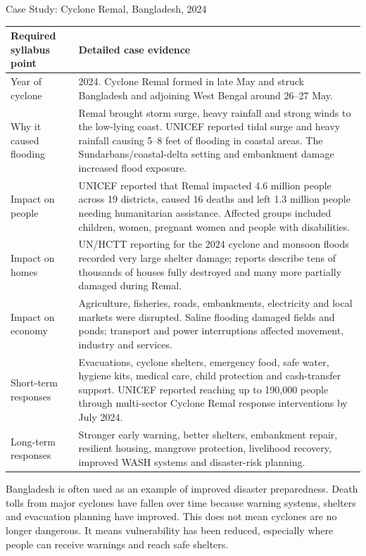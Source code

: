 \documentclass[11pt,a4paper]{article}
\begin{document}
\begin{casebox}{Case Study: Cyclone Remal, Bangladesh, 2024}
\begin{longtable}{p{3.35cm}p{11.2cm}}
\toprule
\textbf{Required syllabus point} & \textbf{Detailed case evidence}\\
\midrule
Year of cyclone & 2024. Cyclone Remal formed in late May and struck Bangladesh and adjoining West Bengal around 26--27 May.\\
Why it caused flooding & Remal brought storm surge, heavy rainfall and strong winds to the low-lying coast. UNICEF reported tidal surge and heavy rainfall causing 5--8 feet of flooding in coastal areas. The Sundarbans/coastal-delta setting and embankment damage increased flood exposure.\\
Impact on people & UNICEF reported that Remal impacted 4.6 million people across 19 districts, caused 16 deaths and left 1.3 million people needing humanitarian assistance. Affected groups included children, women, pregnant women and people with disabilities.\\
Impact on homes & UN/HCTT reporting for the 2024 cyclone and monsoon floods recorded very large shelter damage; reports describe tens of thousands of houses fully destroyed and many more partially damaged during Remal.\\
Impact on economy & Agriculture, fisheries, roads, embankments, electricity and local markets were disrupted. Saline flooding damaged fields and ponds; transport and power interruptions affected movement, industry and services.\\
Short-term responses & Evacuations, cyclone shelters, emergency food, safe water, hygiene kits, medical care, child protection and cash-transfer support. UNICEF reported reaching up to 190,000 people through multi-sector Cyclone Remal response interventions by July 2024.\\
Long-term responses & Stronger early warning, better shelters, embankment repair, resilient housing, mangrove protection, livelihood recovery, improved WASH systems and disaster-risk planning.\\
\bottomrule
\end{longtable}
\end{casebox}

Bangladesh is often used as an example of improved disaster preparedness. Death tolls from major cyclones have fallen over time because warning systems, shelters and evacuation planning have improved. This does not mean cyclones are no longer dangerous. It means vulnerability has been reduced, especially where people can receive warnings and reach safe shelters.
\end{document}
